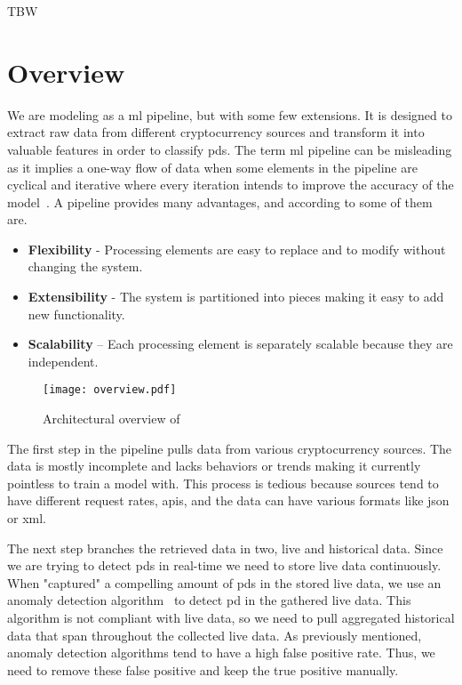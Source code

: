 TBW
\section{Overview}
We are modeling \project as a \ac{ml} pipeline, but with some few extensions. It is designed to extract raw data from different cryptocurrency sources and transform it into valuable features in order to classify \acp{pd}. The term \ac{ml} pipeline can be misleading as it implies a one-way flow of data when some elements in the pipeline are cyclical and iterative where every iteration intends to improve the accuracy of the model~\cite{ml_pipeline_3}. A pipeline provides many advantages, and according to \cite{ml_pipeline_2} some of them are.

\begin{itemize}
    \item \textbf{Flexibility} - Processing elements are easy to replace and to modify without changing the system.
    \item \textbf{Extensibility} - The system is partitioned into pieces making it easy to add new functionality.
    \item \textbf{Scalability} – Each processing element is separately scalable because they are independent.
\end{itemize}

\begin{figure}[ht]
    \centering
    \texttt{[image: overview.pdf]}
    \caption{Architectural overview of \project}
    \label{fig:overview}
\end{figure}

The first step in the pipeline pulls data from various cryptocurrency sources. The data is mostly incomplete and lacks behaviors or trends making it currently pointless to train a model with. This process is tedious because sources tend to have different request rates, \acp{api}, and the data can have various formats like \ac{json} or \ac{xml}.

The next step branches the retrieved data in two, live and historical data. Since we are trying to detect \acp{pd} in real-time we need to store live data continuously. When "captured" a compelling amount of \acp{pd} in the stored live data, we use an anomaly detection algorithm~\cite{P&D_to_the_moon} to detect \ac{pd} in the gathered live data. This algorithm is not compliant with live data, so we need to pull aggregated historical data that span throughout the collected live data. As previously mentioned, anomaly detection algorithms tend to have a high false positive rate. Thus, we need to remove these false positive and keep the true positive manually.


